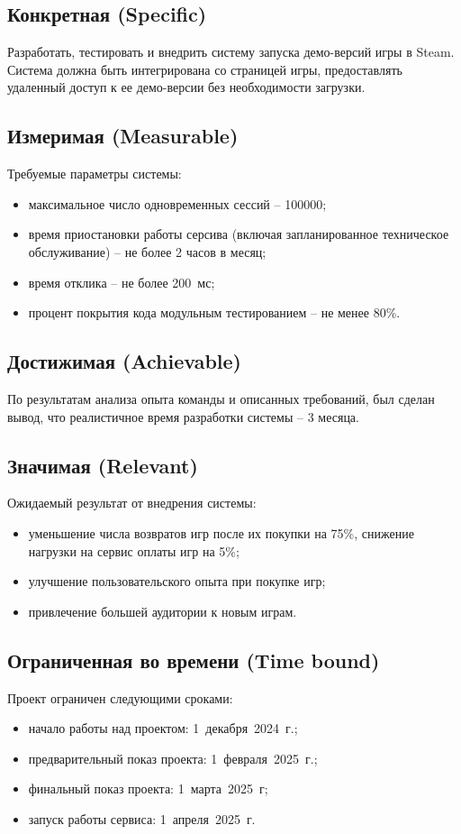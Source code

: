\documentclass[12pt, a4paper]{article}
\begin{document}
\subsection{Конкретная (Specific)}

Разработать, тестировать и внедрить систему запуска демо-версий игры в Steam. Система должна быть интегрирована со страницей игры, предоставлять удаленный доступ к ее демо-версии без необходимости загрузки.

\subsection{Измеримая (Measurable)}
Требуемые параметры системы:
\begin{itemize}
	\item максимальное число одновременных сессий -- 100000;
	\item время приостановки работы серсива (включая запланированное техническое обслуживание) -- не более 2 часов в месяц;
	\item время отклика -- не более 200~мс;
	\item процент покрытия кода модульным тестированием -- не менее 80\%.
\end{itemize}

\subsection{Достижимая (Achievable)}
По результатам анализа опыта команды и описанных требований, был сделан вывод, что реалистичное время разработки системы -- 3 месяца.

\subsection{Значимая (Relevant)}
Ожидаемый результат от внедрения системы:
\begin{itemize}
	\item уменьшение числа возвратов игр после их покупки на 75\%, снижение нагрузки на сервис оплаты игр на 5\%;
	\item улучшение пользовательского опыта при покупке игр;
	\item привлечение большей аудитории к новым играм.
\end{itemize}

\subsection{Ограниченная во времени (Time bound)}
Проект ограничен следующими сроками:
\begin{itemize}
	\item начало работы над проектом: 1~декабря~2024~г.;
	\item предварительный показ проекта: 1~февраля~2025~г.;
	\item финальный показ проекта: 1~марта~2025~г;
	\item запуск работы сервиса: 1~апреля~2025~г. 
\end{itemize}
\end{document}
